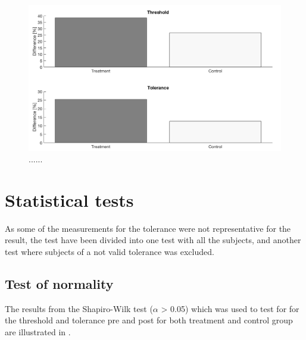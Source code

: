 \begin{figure}[H]
	\includegraphics[width=1\textwidth]{figures/barplot.png} 
	\caption{......}
	\label{fig:barplot}  
\end{figure}


\section{Statistical tests}
As some of the measurements for the tolerance were not representative for the result, the test have been divided into one test with all the subjects, and another test where subjects of a not valid tolerance was excluded.

\subsection{Test of normality}
The results from the Shapiro-Wilk test ($\alpha$ > 0.05) which was used to test for for the threshold and tolerance pre and post for both treatment and control group are illustrated in .

